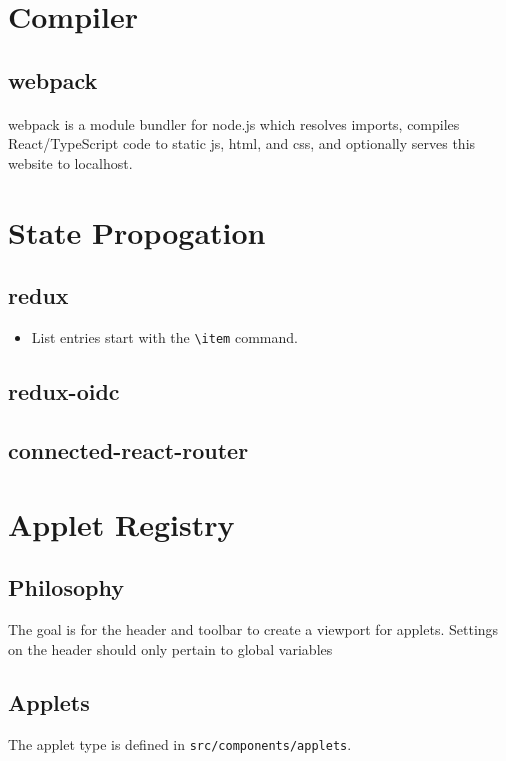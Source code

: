\documentclass[12pt]{article}
\begin{document}
\tableofcontents
\newpage


\section{Compiler}
\subsection{webpack}
\paragraph{}webpack is a module bundler for node.js which resolves imports, compiles React/TypeScript code to static js, html, and css, and optionally serves this website to localhost. 


\newpage


\section{State Propogation}
\subsection{redux}
\begin{itemize}
  \item List entries start with the \verb|\item| command.
\end{itemize}
\subsection{redux-oidc}
\subsection{connected-react-router}

\newpage

\section{Applet Registry}
\subsection{Philosophy} The goal is for the header and toolbar to create a viewport for applets. Settings on the header should only pertain to global variables
\subsection{Applets} The applet type is defined in \lstinline{src/components/applets}.

\newpage
\end{document}
